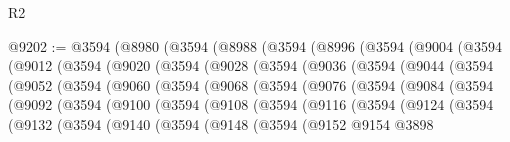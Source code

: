 \begin{lexlean}{R2}
\begin{coremodule}
@9202 := @3594
    (@8980
      (@3594
        (@8988
          (@3594
            (@8996
              (@3594
                (@9004
                  (@3594
                    (@9012
                      (@3594
                        (@9020
                          (@3594
                            (@9028
                              (@3594
                                (@9036
                                  (@3594
                                    (@9044
                                      (@3594
                                        (@9052
                                          (@3594
                                            (@9060
                                              (@3594
                                                (@9068
                                                  (@3594
                                                    (@9076
                                                      (@3594
                                                        (@9084
                                                          (@3594
                                                            (@9092
                                                              (@3594
                                                                (@9100
                                                                  (@3594
                                                                    (@9108
                                                                      (@3594
                                                                        (@9116
                                                                          (@3594
                                                                            (@9124
                                                                              (@3594
                                                                                (@9132
                                                                                  (@3594
                                                                                    (@9140
                                                                                      (@3594
                                                                                        (@9148
                                                                                          (@3594
                                                                                            (@9152
                                                                                              @9154
                                                                                              @3898

\end{coremodule}
\end{lexlean}
